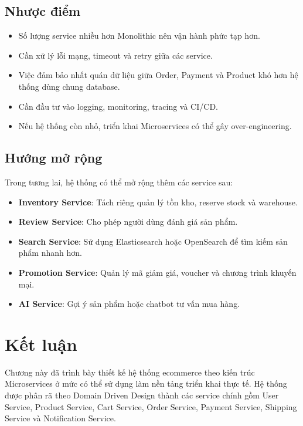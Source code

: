 \subsection{Nhược điểm}

\begin{itemize}
  \item Số lượng service nhiều hơn Monolithic nên vận hành phức tạp hơn.
  \item Cần xử lý lỗi mạng, timeout và retry giữa các service.
  \item Việc đảm bảo nhất quán dữ liệu giữa Order, Payment và Product khó hơn hệ thống dùng chung database.
  \item Cần đầu tư vào logging, monitoring, tracing và CI/CD.
  \item Nếu hệ thống còn nhỏ, triển khai Microservices có thể gây over-engineering.
\end{itemize}

\subsection{Hướng mở rộng}

Trong tương lai, hệ thống có thể mở rộng thêm các service sau:

\begin{itemize}
  \item \textbf{Inventory Service}: Tách riêng quản lý tồn kho, reserve stock và warehouse.
  \item \textbf{Review Service}: Cho phép người dùng đánh giá sản phẩm.
  \item \textbf{Search Service}: Sử dụng Elasticsearch hoặc OpenSearch để tìm kiếm sản phẩm nhanh hơn.
  \item \textbf{Promotion Service}: Quản lý mã giảm giá, voucher và chương trình khuyến mại.
  \item \textbf{AI Service}: Gợi ý sản phẩm hoặc chatbot tư vấn mua hàng.
\end{itemize}

\section{Kết luận}

Chương này đã trình bày thiết kế hệ thống ecommerce theo kiến trúc Microservices ở mức có thể sử dụng làm nền tảng triển khai thực tế. Hệ thống được phân rã theo Domain Driven Design thành các service chính gồm User Service, Product Service, Cart Service, Order Service, Payment Service, Shipping Service và Notification Service.

